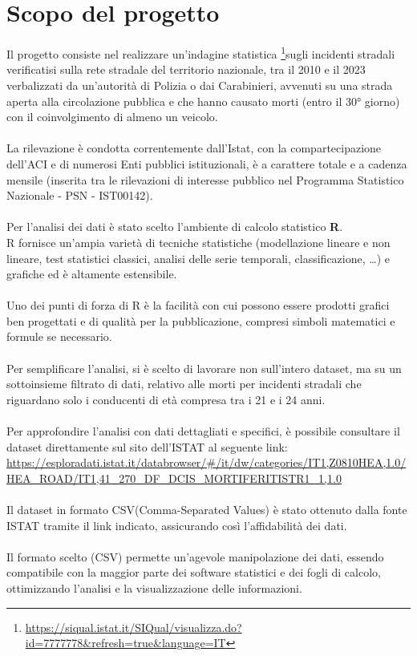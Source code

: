 \documentclass[14pt, openany, titlepage]{report} %
\begin{document}
\section{Scopo del progetto}
Il progetto consiste nel realizzare un’indagine statistica \footnote{\url{https://siqual.istat.it/SIQual/visualizza.do?id=7777778&refresh=true&language=IT}}sugli incidenti stradali verificatisi sulla rete stradale del territorio nazionale, tra il 2010 e il 2023 verbalizzati da un'autorità di Polizia o dai Carabinieri, 
avvenuti su una strada aperta alla circolazione pubblica e che hanno causato morti (entro il 30° giorno) con il coinvolgimento 
di almeno un veicolo. \\\\
\noindent
La rilevazione è condotta correntemente dall’Istat, con la compartecipazione dell'ACI e di numerosi Enti pubblici istituzionali, 
è a carattere totale e a cadenza mensile (inserita tra le rilevazioni di interesse pubblico nel Programma Statistico Nazionale - PSN - IST00142). \\\\
\noindent
Per l'analisi dei dati è stato scelto l'ambiente di calcolo statistico \textbf{R}. \\
R fornisce un'ampia varietà di tecniche statistiche (modellazione lineare e non lineare, test statistici classici, analisi delle serie temporali, classificazione, \dots)
e grafiche ed è altamente estensibile.\\\\
\noindent
Uno dei punti di forza di R è la facilità con cui possono essere prodotti grafici ben progettati e di qualità per la pubblicazione, 
compresi simboli matematici e formule se necessario.\\\\
\noindent
Per semplificare l'analisi, si è scelto di lavorare non sull'intero dataset, 
ma su un sottoinsieme filtrato di dati, relativo alle morti per incidenti stradali che riguardano solo i conducenti di età compresa tra i 21 e i 24 anni.\\\\
\noindent
Per approfondire l'analisi con dati dettagliati e specifici, è possibile consultare il dataset direttamente sul sito dell'ISTAT al seguente link:
\url{https://esploradati.istat.it/databrowser/#/it/dw/categories/IT1,Z0810HEA,1.0/HEA_ROAD/IT1,41_270_DF_DCIS_MORTIFERITISTR1_1,1.0}\\\\
\noindent
Il dataset in formato CSV(Comma-Separated Values) è stato ottenuto dalla fonte ISTAT tramite il link indicato, assicurando così l'affidabilità dei dati.\\\\
Il formato scelto (CSV) permette un'agevole manipolazione dei dati, essendo compatibile con la maggior parte dei software statistici e
dei fogli di calcolo, ottimizzando l'analisi e la visualizzazione delle informazioni.\\
\end{document}
